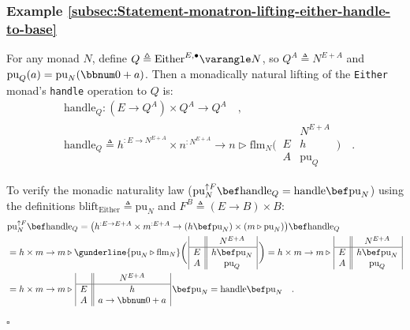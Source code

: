 \subsubsection{Example \label{subsec:Statement-monatron-lifting-either-handle-to-base}\ref{subsec:Statement-monatron-lifting-either-handle-to-base}}

For any monad $N$, define $Q\triangleq\text{Either}^{E,\bullet}\varangle N$,
so $Q^{A}\triangleq N^{E+A}$ and $\text{pu}_{Q}(a)=\text{pu}_{N}(\bbnum 0+a)$.
Then a monadically natural lifting of the \lstinline!Either! monad\textsf{'}s
\lstinline!handle! operation to $Q$ is:
\begin{align*}
 & \text{handle}_{Q}:(E\rightarrow Q^{A})\times Q^{A}\rightarrow Q^{A}\quad,\\
 & \text{handle}_{Q}\triangleq h^{:E\rightarrow N^{E+A}}\times n^{:N^{E+A}}\rightarrow n\triangleright\text{flm}_{N}\bigg(\,\begin{array}{|c||c|}
 & N^{E+A}\\
\hline E & h\\
A & \text{pu}_{Q}
\end{array}\,\bigg)\quad.
\end{align*}

To verify the monadic naturality law ($\text{pu}_{N}^{\uparrow F}\bef\text{handle}_{Q}=\text{handle}\bef\text{pu}_{N}$)
using the definitions $\text{blift}_{\text{Either}}\triangleq\text{pu}_{N}$
and $F^{B}\triangleq\left(E\rightarrow B\right)\times B$:
\begin{align*}
 & \text{pu}_{N}^{\uparrow F}\bef\text{handle}_{Q}=\big(h^{:E\rightarrow E+A}\times m^{:E+A}\rightarrow(h\bef\text{pu}_{N})\times(m\triangleright\text{pu}_{N})\big)\bef\text{handle}_{Q}\\
 & =h\times m\rightarrow m\triangleright\gunderline{\text{pu}_{N}\triangleright\text{flm}_{N}}\bigg(\,\begin{array}{|c||c|}
 & N^{E+A}\\
\hline E & h\bef\text{pu}_{N}\\
A & \text{pu}_{Q}
\end{array}\,\bigg)=h\times m\rightarrow m\triangleright\,\begin{array}{|c||c|}
 & N^{E+A}\\
\hline E & h\bef\text{pu}_{N}\\
A & \text{pu}_{Q}
\end{array}\\
 & =h\times m\rightarrow m\triangleright\,\begin{array}{|c||c|}
 & N^{E+A}\\
\hline E & h\\
A & a\rightarrow\bbnum 0+a
\end{array}\,\bef\text{pu}_{N}=\text{handle}\bef\text{pu}_{N}\quad.
\end{align*}
$\square$

